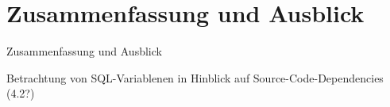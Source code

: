 \section{Zusammenfassung und Ausblick}\label{chap:conclusion}

%
%

Zusammenfassung und Ausblick


Betrachtung von SQL-Variablenen in Hinblick auf Source-Code-Dependencies (4.2?)